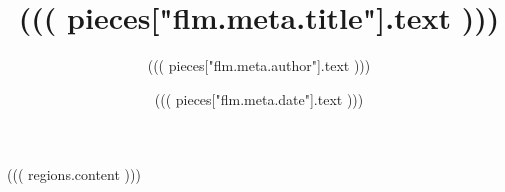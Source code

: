 \documentclass[twocolumn]{article}
\begin{document}
\title{((( pieces["flm.meta.title"].text )))}
\author{((( pieces["flm.meta.author"].text )))}
\date{((( pieces["flm.meta.date"].text )))}
\maketitle
((( regions.content )))
\end{document}

